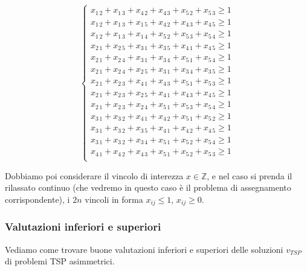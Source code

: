 \documentclass[a4paper,11pt]{article}
\begin{document}
$$\begin{cases}
	x_{1 \, 2} + x_{1 \, 3} + x_{4 \, 2} + x_{4 \, 3} + x_{5 \, 2} + x_{5 \, 3} \geq 1 \\
	x_{1 \, 2} + x_{1 \, 3} + x_{1 \, 5} + x_{4 \, 2} + x_{4 \, 3} + x_{4 \, 5} \geq 1 \\
	x_{1 \, 2} + x_{1 \, 3} + x_{1 \, 4} + x_{5 \, 2} + x_{5 \, 3} + x_{5 \, 4} \geq 1 \\
	x_{2 \, 1} + x_{2 \, 5} + x_{3 \, 1} + x_{3 \, 5} + x_{4 \, 1} + x_{4 \, 5} \geq 1 \\
	x_{2 \, 1} + x_{2 \, 4} + x_{3 \, 1} + x_{3 \, 4} + x_{5 \, 1} + x_{5 \, 4} \geq 1 \\
	x_{2 \, 1} + x_{2 \, 4} + x_{2 \, 5} + x_{3 \, 1} + x_{3 \, 4} + x_{3 \, 5} \geq 1 \\
	x_{2 \, 1} + x_{2 \, 3} + x_{4 \, 1} + x_{4 \, 3} + x_{5 \, 1} + x_{5 \, 3} \geq 1 \\
	x_{2 \, 1} + x_{2 \, 3} + x_{2 \, 5} + x_{4 \, 1} + x_{4 \, 3} + x_{4 \, 5} \geq 1 \\
	x_{2 \, 1} + x_{2 \, 3} + x_{2 \, 4} + x_{5 \, 1} + x_{5 \, 3} + x_{5 \, 4} \geq 1 \\
	x_{3 \, 1} + x_{3 \, 2} + x_{4 \, 1} + x_{4 \, 2} + x_{5 \, 1} + x_{5 \, 2} \geq 1 \\
	x_{3 \, 1} + x_{3 \, 2} + x_{3 \, 5} + x_{4 \, 1} + x_{4 \, 2} + x_{4 \, 5} \geq 1 \\
	x_{3 \, 1} + x_{3 \, 2} + x_{3 \, 4} + x_{5 \, 1} + x_{5 \, 2} + x_{5 \, 4} \geq 1 \\
	x_{4 \, 1} + x_{4 \, 2} + x_{4 \, 3} + x_{5 \, 1} + x_{5 \, 2} + x_{5 \, 3} \geq 1 \\
\end{cases}
$$

Dobbiamo poi considerare il vincolo di interezza $x \in \mathbb{Z}$, e nel caso si prenda il rilassato continuo (che vedremo in questo caso è il problema di assegnamento corrispondente), i $2n$ vincoli in forma $x_{ij} \leq 1$, $x_{ij} \geq 0$.

\subsubsection{Valutazioni inferiori e superiori}
Vediamo come trovare buone valutazioni inferiori e superiori delle soluzioni $v_{TSP}$ di problemi TSP asimmetrici.
\end{document}
